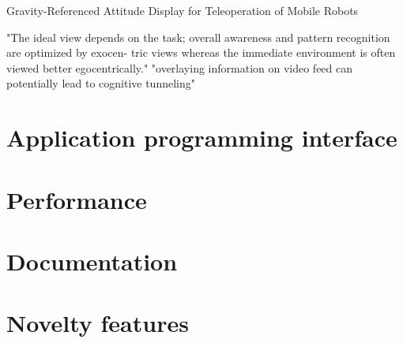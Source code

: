 \citep{Wang2004} Gravity-Referenced Attitude Display for Teleoperation of Mobile Robots

\citep{Chen2007} "The ideal view depends on the task; overall awareness and pattern recognition are optimized by exocen- tric views whereas the immediate environment is often viewed better egocentrically."
"overlaying information on video feed can potentially lead to cognitive tunneling"


\section{Application programming interface}


\section{Performance}


\section{Documentation}




\section{Novelty features}

